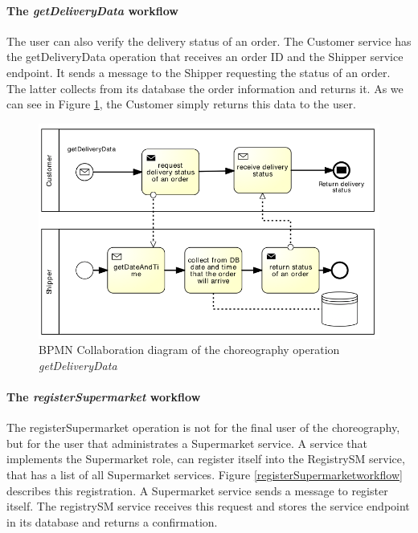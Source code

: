 \paragraph{The \emph{getDeliveryData} workflow\\}
The user can also verify the delivery status of an order. The Customer service has the getDeliveryData operation that receives an order ID and the Shipper service endpoint. It sends a message to the Shipper requesting the status of an order. The latter collects from its database the order information and returns it. As we can see in Figure \ref{getDeliveryDataworkflow}, the Customer simply returns this data to the user.

\begin{figure}[htbp]
\begin{center}
	\includegraphics{images/getDeliveryDataworkflow}
\caption{BPMN Collaboration diagram of the choreography operation \emph{getDeliveryData}}
\label{getDeliveryDataworkflow}
\end{center}
\end{figure}

\paragraph{The \emph{registerSupermarket} workflow\\}
The registerSupermarket operation is not for the final user of the choreography, but for the user that administrates a Supermarket service. A service that implements the Supermarket role, can register itself into the RegistrySM service, that has a list of all Supermarket services. Figure \ref{registerSupermarketworkflow} describes this registration. A Supermarket service sends a message to register itself. The registrySM service receives this request and stores the service endpoint in its database and returns a confirmation.

